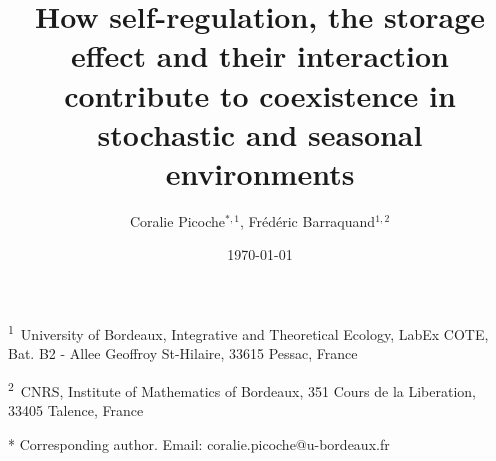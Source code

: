 \documentclass[a4paper,12pt]{article}
\begin{document}
\title{\Huge How self-regulation, the storage effect and their interaction contribute
to coexistence in stochastic and seasonal environments}
\date{\today}
\author{\Large Coralie Picoche$^{*,1}$, Fr\'ed\'eric Barraquand$^{1,2}$}

\maketitle
 
{\large{}}\textsuperscript{{\large{}1}}{\large{}~University of
Bordeaux, Integrative and Theoretical Ecology, LabEx COTE, Bat. B2
- Allee Geoffroy St-Hilaire, 33615 Pessac, France \bigskip{}
}{\large\par}

{\large{}}\textsuperscript{{\large{}2}}{\large{}~CNRS, Institute
of Mathematics of Bordeaux, 351 Cours de la Liberation, 33405 Talence,
France}{\large\par}

{\large{}\bigskip{}
}{\large\par}

{\large{}\bigskip{}
}{\large\par}

{\large{}\bigskip{}
}{\large\par}

{\large{}\bigskip{}
}{\large\par}

{*} Corresponding author. Email: coralie.picoche@u-bordeaux.fr
 
 \doublespacing
\pagebreak{}
\end{document}
